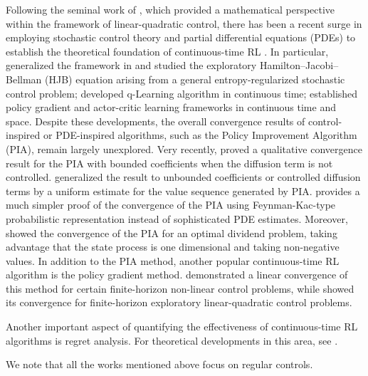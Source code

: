\documentclass[11pt]{amsart}
\theoremstyle{plain}
\numberwithin{equation}{section}
\begin{document}
Following the seminal work of \cite{wang2020reinforcement}, which provided a mathematical perspective within the framework of linear-quadratic control, there has been a recent surge in employing stochastic control theory and partial differential equations (PDEs) to establish the theoretical foundation of continuous-time RL \cite{bai2023reinforcement,huang2022convergence,jia2023q,jia2022policy,ma2024convergence,tang2022exploratory,tran2024policy}. 
In particular, \cite{tang2022exploratory} generalized the framework in \cite{wang2020reinforcement} and studied the exploratory Hamilton--Jacobi--Bellman (HJB) equation arising from a general entropy-regularized stochastic control problem; \cite{jia2023q} developed q-Learning algorithm in continuous time; \cite{jia2022policy} established policy gradient and actor-critic learning frameworks in continuous time and space.  Despite these developments, the overall convergence results of control-inspired or PDE-inspired algorithms, such as the Policy Improvement Algorithm (PIA), remain largely unexplored.
Very recently, \cite{huang2022convergence} proved a qualitative convergence result for the PIA with bounded coefficients when the diffusion term is not controlled.  \cite{tran2024policy} generalized the result to unbounded coefficients or controlled diffusion terms by a uniform estimate for the value sequence generated by PIA. \cite{ma2024convergence}
 provides a much simpler proof of the convergence of the PIA using Feynman-Kac-type probabilistic representation instead of sophisticated PDE estimates.
Moreover, \cite{bai2023reinforcement} showed the convergence of the PIA for an optimal dividend problem, taking advantage that the state process is one dimensional and taking non-negative values. In addition to the PIA method, another popular continuous-time  RL algorithm is the policy gradient method. \cite{reisinger2023linear} demonstrated a linear convergence of this method for certain finite-horizon non-linear control problems, while \cite{giegrich2024convergence} showed its convergence for finite-horizon exploratory linear-quadratic control problems.

Another important aspect of quantifying the effectiveness of continuous-time RL algorithms is regret analysis. For theoretical developments in this area, see \cite{basei2022logarithmic,guo2023reinforcement,szpruch2021exploration,neuman2023offline,szpruch2024optimal}.


We note that all the works mentioned above focus on regular controls.

\vspace{0.2cm}
\end{document}
